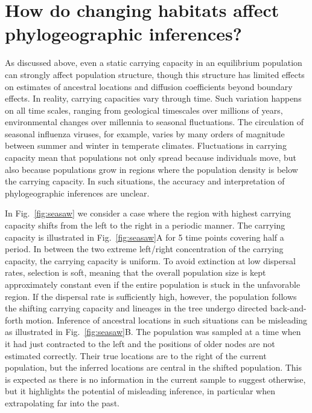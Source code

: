 \documentclass[aps,rmp, twocolumn]{revtex4}
\begin{document}
\section*{How do changing habitats affect phylogeographic inferences?}
As discussed above, even a static carrying capacity in an equilibrium population can strongly affect population structure, though this structure has limited effects on estimates of ancestral locations and diffusion coefficients beyond boundary effects.
In reality, carrying capacities vary through time.
Such variation happens on all time scales, ranging from geological timescales over millions of years, environmental changes over millennia to seasonal fluctuations.
The circulation of seasonal influenza viruses, for example, varies by many orders of magnitude between summer and winter in temperate climates.
Fluctuations in carrying capacity mean that populations not only spread because individuals move, but also because populations grow in regions where the population density is below the carrying capacity.
In such situations, the accuracy and interpretation of phylogeographic inferences are unclear.

In Fig.~\ref{fig:seasaw} we consider a case where the region with highest carrying capacity shifts from the left to the right in a periodic manner.
The carrying capacity is illustrated in Fig.~\ref{fig:seasaw}A for 5 time points covering half a period.
In between the two extreme left/right concentration of the carrying capacity, the carrying capacity is uniform.
To avoid extinction at low dispersal rates, selection is soft, meaning that the overall population size is kept approximately constant even if the entire population is stuck in the unfavorable region.
If the dispersal rate is sufficiently high, however, the population follows the shifting carrying capacity and lineages in the tree undergo directed back-and-forth motion.
Inference of ancestral locations in such situations can be misleading as illustrated in Fig.~\ref{fig:seasaw}B.
The population was sampled at a time when it had just contracted to the left and the positions of older nodes are not estimated correctly.
Their true locations are to the right of the current population, but the inferred locations are central in the shifted population.
This is expected as there is no information in the current sample to suggest otherwise, but it highlights the potential of misleading inference, in particular when extrapolating far into the past.
\end{document}
